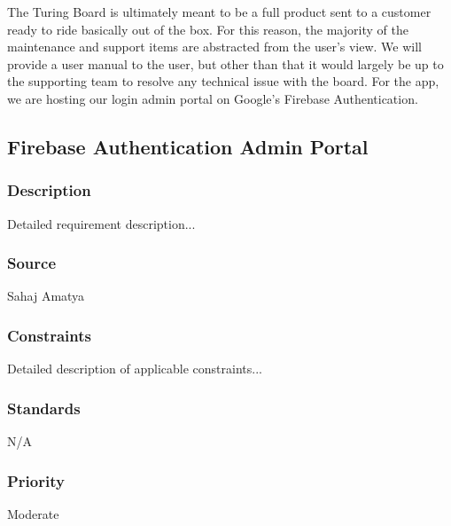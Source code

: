 The Turing Board is ultimately meant to be a full product sent to a customer ready to ride basically out of the box. For this reason, the majority of the maintenance and support items are abstracted from the user's view. We will provide a user manual to the user, but other than that it would largely be up to the supporting team to resolve any technical issue with the board. For the app, we are hosting our login admin portal on Google's Firebase Authentication. 

\subsection{Firebase Authentication Admin Portal}
\subsubsection{Description}
Detailed requirement description...
\subsubsection{Source}
Sahaj Amatya
\subsubsection{Constraints}
Detailed description of applicable constraints...
\subsubsection{Standards}
N/A
\subsubsection{Priority}
Moderate

